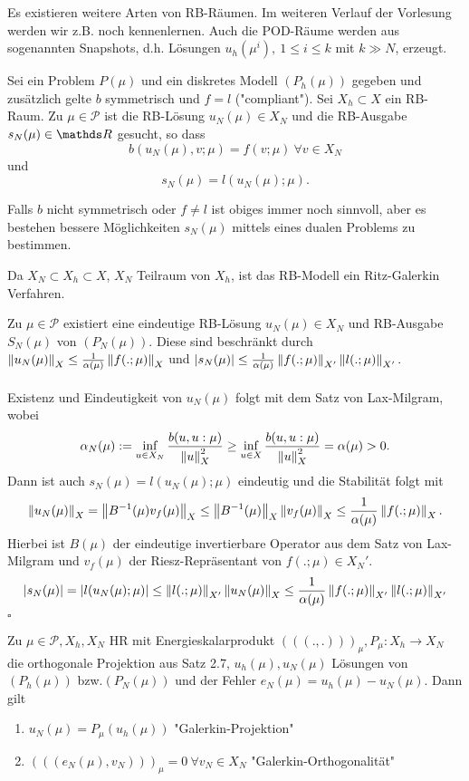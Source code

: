 Es existieren weitere Arten von RB-Räumen.
Im weiteren Verlauf der Vorlesung werden wir z.B. noch  kennenlernen.
Auch die POD-Räume werden aus sogenannten Snapshots, d.h. Lösungen $u_h(\mu^i),~1\le i\le k$ mit $k\gg N$, erzeugt.

Sei ein Problem $P(\mu)$ und ein diskretes Modell $(P_h(\mu))$ gegeben und zusätzlich gelte $b$ symmetrisch und $f=l$ ("compliant").
Sei $X_h\subset X$ ein RB-Raum.
Zu $\mu \in \mathcal{P}$ ist die RB-Lösung $u_N(\mu)\in X_N$ und die RB-Ausgabe $s_N(\mu)\in \R$ gesucht, so dass
\[
b(u_N(\mu),v;\mu) = f(v;\mu) ~\forall v\in X_N
\]
und 
\[
s_N(\mu) = l(u_N(\mu);\mu).
\]

Falls $b$ nicht symmetrisch oder $f\neq l$ ist obiges immer noch sinnvoll, aber es bestehen bessere Möglichkeiten $s_N(\mu)$ mittels eines dualen Problems zu bestimmen.

Da $X_N\subset X_h\subset X$, $X_N$ Teilraum von $X_h$, ist das RB-Modell ein Ritz-Galerkin Verfahren.

Zu $\mu\in\mathcal{P}$ existiert eine eindeutige RB-Lösung $u_N(\mu)\in X_N$ und RB-Ausgabe $S_N(\mu)$ von $(P_N(\mu))$.
Diese sind beschränkt durch $\left\Vert u_N(\mu)\right\Vert_X \le \frac{1}{\alpha(\mu)} \left\Vert f(.;\mu)\right\Vert_{X}$ und $\left\vert s_N(\mu)\right\vert\le \frac{1}{\alpha(\mu)}\left\Vert f(.;\mu)\right\Vert_{X'}\left\Vert l(.;\mu)\right\Vert_{X'}.$\\

\\
Existenz und Eindeutigkeit von $u_N(\mu)$ folgt mit dem Satz von Lax-Milgram, wobei
\[
\alpha_N(\mu) := \inf\limits_{u\in X_N} \frac{b(u,u:\mu)}{\left\Vert u\right\Vert_X^2} \ge \inf\limits_{u\in X} \frac{b(u,u:\mu)}{\left\Vert u\right\Vert_X^2} = \alpha(\mu) > 0.
\]
Dann ist auch $s_N(\mu) = l(u_N(\mu);\mu)$ eindeutig und die Stabilität folgt mit
\[
\left\Vert u_N(\mu)\right\Vert_X = \left\Vert B^{-1}(\mu) v_f(\mu)\right\Vert_X \le \left\Vert B^{-1}(\mu)\right\Vert_X \left\Vert v_f(\mu)\right\Vert_X \le \frac{1}{\alpha(\mu)}\left\Vert f(.;\mu)\right\Vert_X.
\]
Hierbei ist $B(\mu)$ der eindeutige invertierbare Operator aus dem Satz von Lax-Milgram und $v_f(\mu)$ der Riesz-Repräsentant von $f(.;\mu)\in X_N'$.
\[
\left\vert s_N(\mu)\right\vert = \left\vert l(u_N(\mu);\mu)\right\vert \le \left\Vert l(.;\mu)\right\Vert_{X'}\left\Vert u_N(\mu)\right\Vert_X \le \frac{1}{\alpha(\mu)} \left\Vert f(.;\mu)\right\Vert_{X'}\left\Vert l(.;\mu)\right\Vert_{X'}
\]
\hfill $\square$

Zu $\mu\in\mathcal{P},X_h,X_N$ HR mit Energieskalarprodukt $(((.,.)))_\mu,P_\mu:X_h\to X_N$ die orthogonale Projektion aus Satz 2.7, $u_h(\mu),u_N(\mu)$ Lösungen von $(P_h(\mu))$ bzw.$(P_N(\mu))$ und der Fehler $e_N(\mu) = u_h(\mu)-u_N(\mu)$.
Dann gilt
\begin{enumerate}[(1)]
	\item $u_N(\mu) = P_\mu(u_h(\mu))$ "Galerkin-Projektion"
	\item $(((e_N(\mu),v_N)))_\mu = 0 ~\forall v_N\in X_N$ "Galerkin-Orthogonalität"
\end{enumerate}


